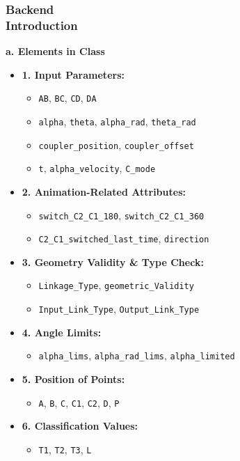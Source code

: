 \documentclass[ucs,10pt]{beamer}
\begin{document}
\begin{frame}
    \frametitle{Backend \\ \small \color{rwth-blue} Introduction}
    \textbf{a. Elements in Class}
    \begin{itemize}
        \item \textbf{1. Input Parameters:}
        \begin{itemize}
            \item \texttt{AB}, \texttt{BC}, \texttt{CD}, \texttt{DA}
            \item \texttt{alpha}, \texttt{theta}, \texttt{alpha\_rad}, \texttt{theta\_rad}
            \item \texttt{coupler\_position}, \texttt{coupler\_offset}
            \item \texttt{t}, \texttt{alpha\_velocity}, \texttt{C\_mode}
        \end{itemize}
        \item \textbf{2. Animation-Related Attributes:}
        \begin{itemize}
            \item \texttt{switch\_C2\_C1\_180}, \texttt{switch\_C2\_C1\_360}
            \item \texttt{C2\_C1\_switched\_last\_time}, \texttt{direction}
        \end{itemize}
        \item \textbf{3. Geometry Validity \& Type Check:}
        \begin{itemize}
            \item \texttt{Linkage\_Type}, \texttt{geometric\_Validity}
            \item \texttt{Input\_Link\_Type}, \texttt{Output\_Link\_Type}
        \end{itemize}
        \item \textbf{4. Angle Limits:}
        \begin{itemize}
            \item \texttt{alpha\_lims}, \texttt{alpha\_rad\_lims}, \texttt{alpha\_limited}
        \end{itemize}
        \item \textbf{5. Position of Points:}
        \begin{itemize}
            \item \texttt{A}, \texttt{B}, \texttt{C}, \texttt{C1}, \texttt{C2}, \texttt{D}, \texttt{P}
        \end{itemize}
        \item \textbf{6. Classification Values:}
        \begin{itemize}
            \item \texttt{T1}, \texttt{T2}, \texttt{T3}, \texttt{L}
        \end{itemize}
    \end{itemize}
\end{frame}
\end{document}
